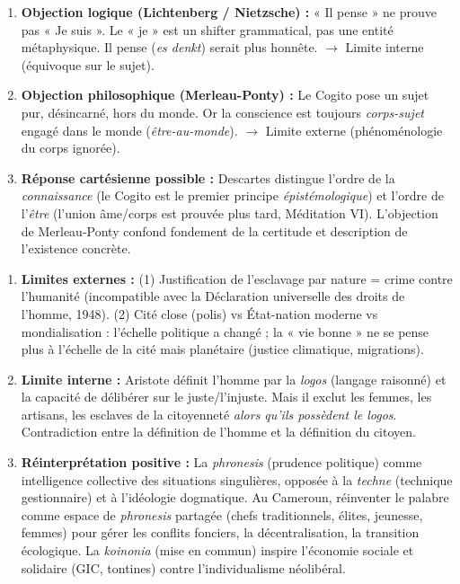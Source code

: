 \documentclass[11pt]{article}
\newcommand{\cle}[1]{{\popxbold\color{popdark}#1}}
\begin{document}
\begin{corrige}[Exercice 1]
\begin{enumerate}
    \item \textbf{Objection logique (Lichtenberg / Nietzsche) :} « Il pense » ne prouve pas « Je suis ». Le « je » est un shifter grammatical, pas une entité métaphysique. \guillemotleft Il pense \guillemotright (\emph{es denkt}) serait plus honnête. $\rightarrow$ Limite interne (équivoque sur le sujet).
    \item \textbf{Objection philosophique (Merleau-Ponty) :} Le Cogito pose un sujet pur, désincarné, hors du monde. Or la conscience est toujours \emph{corps-sujet} engagé dans le monde (\emph{être-au-monde}). $\rightarrow$ Limite externe (phénoménologie du corps ignorée).
    \item \textbf{Réponse cartésienne possible :} Descartes distingue l'ordre de la \emph{connaissance} (le Cogito est le premier principe \emph{épistémologique}) et l'ordre de l'\emph{être} (l'union âme/corps est prouvée plus tard, Méditation VI). L'objection de Merleau-Ponty confond fondement de la certitude et description de l'existence concrète.
\end{enumerate}
\end{corrige}

\begin{corrige}[Exercice 2]
\begin{enumerate}
    \item \textbf{Limites externes :} (1) Justification de l'esclavage par nature = crime contre l'humanité (incompatible avec la Déclaration universelle des droits de l'homme, 1948). (2) Cité close (polis) vs État-nation moderne vs mondialisation : l'échelle politique a changé ; la « vie bonne » ne se pense plus à l'échelle de la cité mais planétaire (justice climatique, migrations).
    \item \textbf{Limite interne :} Aristote définit l'homme par la \emph{logos} (langage raisonné) et la capacité de délibérer sur le juste/l'injuste. Mais il exclut les femmes, les artisans, les esclaves de la citoyenneté \emph{alors qu'ils possèdent le logos}. Contradiction entre la définition de l'homme et la définition du citoyen.
    \item \textbf{Réinterprétation positive :} La \emph{phronesis} (prudence politique) comme intelligence collective des situations singulières, opposée à la \emph{techne} (technique gestionnaire) et à l'idéologie dogmatique. Au Cameroun, réinventer le \cle{palabre} comme espace de \emph{phronesis} partagée (chefs traditionnels, élites, jeunesse, femmes) pour gérer les conflits fonciers, la décentralisation, la transition écologique. La \emph{koinonia} (mise en commun) inspire l'économie sociale et solidaire (GIC, tontines) contre l'individualisme néolibéral.
\end{enumerate}
\end{corrige}
\end{document}
